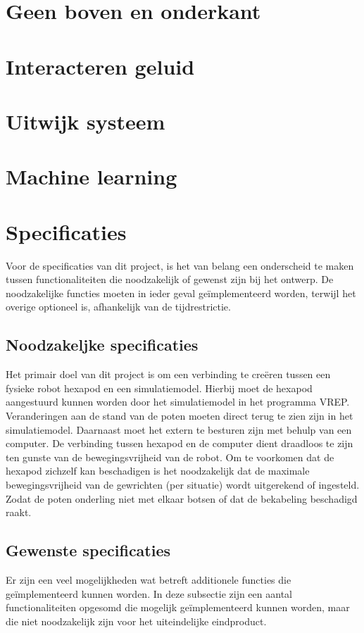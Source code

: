 \documentclass[10pt,a4paper]{article}
\begin{document}
\section{Geen boven en onderkant}
\section{Interacteren geluid}
\section{Uitwijk systeem}
\section{Machine learning}

\fi

\section{Specificaties}

Voor de specificaties van dit project, is het van belang een onderscheid te maken tussen functionaliteiten die noodzakelijk of gewenst zijn bij het ontwerp. De noodzakelijke functies moeten in ieder geval ge\"implementeerd worden, terwijl het overige optioneel is, afhankelijk van de tijdrestrictie.

\subsection{Noodzakeljke specificaties}
Het primair doel van dit project is om een verbinding te cre\"eren tussen een fysieke robot hexapod en een simulatiemodel. Hierbij moet de hexapod aangestuurd kunnen worden door het simulatiemodel in het programma VREP. Veranderingen aan de stand van de poten moeten direct terug te zien zijn in het simulatiemodel. Daarnaast moet het extern te besturen zijn met behulp van een computer. De verbinding tussen hexapod en de computer dient draadloos te zijn ten gunste van de bewegingsvrijheid van de robot. %
Om te voorkomen dat de hexapod zichzelf kan beschadigen is het noodzakelijk dat de maximale bewegingsvrijheid van de gewrichten (per situatie) wordt uitgerekend of ingesteld. Zodat de poten onderling niet met elkaar botsen of dat de bekabeling beschadigd raakt.

\subsection{Gewenste specificaties}
Er zijn een veel mogelijkheden wat betreft additionele functies die ge\"implementeerd kunnen worden. In deze subsectie zijn een aantal functionaliteiten opgesomd die mogelijk ge\"implementeerd kunnen worden, maar die niet noodzakelijk zijn voor het uiteindelijke eindproduct.
\end{document}

